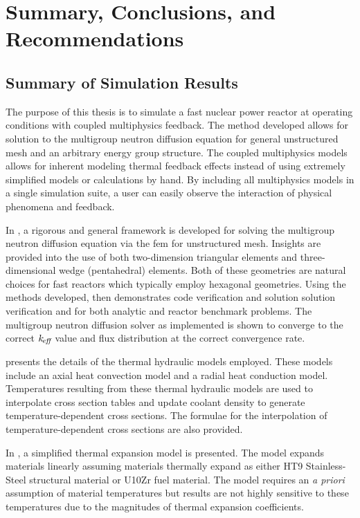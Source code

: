 \chapter{Summary, Conclusions, and Recommendations}
\label{ch:conclusions}

\section{Summary of Simulation Results}

  The purpose of this thesis is to simulate a fast nuclear power reactor at 
  operating conditions with coupled multiphysics feedback. The method
  developed allows for solution to the multigroup neutron diffusion equation for
  general unstructured mesh and an arbitrary energy group structure. The coupled 
  multiphysics models allows for inherent modeling thermal feedback effects 
  instead of using extremely simplified models or calculations by hand. By 
  including all multiphysics models in a single simulation suite, a user can 
  easily observe the interaction of physical phenomena and feedback.

  In , a rigorous and general framework is developed
  for solving the multigroup neutron diffusion equation via the \gls{fem} for
  unstructured mesh. Insights are provided into the use of both
  two-dimension triangular elements and three-dimensional wedge (pentahedral)
  elements. Both of these geometries are natural choices for fast reactors which 
  typically employ hexagonal geometries. Using the methods developed,
   then demonstrates code verification and solution
  solution verification and for both analytic and reactor benchmark problems. 
  The multigroup neutron diffusion solver as implemented is shown to converge to 
  the correct $k_{\!\mbox{\scriptsize \em eff}}$ value and flux distribution at the correct convergence 
  rate.

   presents the details of the thermal hydraulic
  models employed. These models include an axial heat convection model and a
  radial heat conduction model. Temperatures resulting from these thermal
  hydraulic models are used to interpolate cross section tables and update
  coolant density to generate temperature-dependent cross sections. The formulae
  for the interpolation of temperature-dependent cross sections are also
  provided.

  In , a simplified thermal expansion model is
  presented. The model expands materials linearly assuming materials thermally
  expand as either HT9 Stainless-Steel structural material or U10Zr fuel 
  material. The model requires an \textit{a priori} assumption of material 
  temperatures but results are not highly sensitive to these temperatures due 
  to the magnitudes of thermal expansion coefficients.

